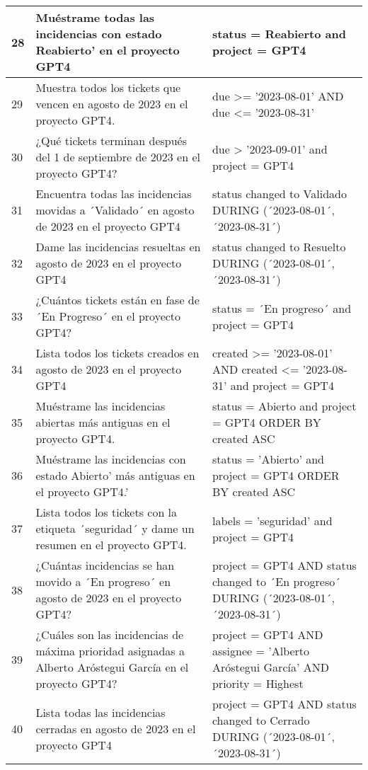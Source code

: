 \begin{center}
\begin{longtable}{ | p{1cm} | p{8cm} | p{6cm} | }
        \hline
        28 & Muéstrame todas las incidencias con estado Reabierto' en el proyecto GPT4 & status = Reabierto and project = GPT4 \\
        \hline
        29 & Muestra todos los tickets que vencen en agosto de 2023 en el proyecto GPT4. & due >= '2023-08-01' AND due <= '2023-08-31' \\
        \hline
        30 & ¿Qué tickets terminan después del 1 de septiembre de 2023 en el proyecto GPT4? & due > '2023-09-01' and project = GPT4 \\
        \hline
        31 & Encuentra todas las incidencias movidas a ´Validado´ en agosto de 2023 en el proyecto GPT4 & status changed to Validado DURING (´2023-08-01´, ´2023-08-31´) \\
        \hline
        32 & Dame las incidencias resueltas en agosto de 2023 en el proyecto GPT4 & status changed to Resuelto DURING (´2023-08-01´, ´2023-08-31´) \\
        \hline
        33 & ¿Cuántos tickets están en fase de ´En Progreso´ en el proyecto GPT4? & status = ´En progreso´ and project = GPT4 \\
        \hline
        34 & Lista todos los tickets creados en agosto de 2023 en el proyecto GPT4 & created >= '2023-08-01' AND created <= '2023-08-31' and project = GPT4 \\
        \hline
        35 & Muéstrame las incidencias abiertas más antiguas en el proyecto GPT4. & status = Abierto and project = GPT4 ORDER BY created ASC \\
        \hline
        36 & Muéstrame las incidencias con estado Abierto' más antiguas en el proyecto GPT4.' & status = 'Abierto' and project = GPT4 ORDER BY created ASC \\
        \hline
        37 & Lista todos los tickets con la etiqueta ´seguridad´ y dame un resumen en el proyecto GPT4. & labels = 'seguridad' and project = GPT4 \\
        \hline
        38 & ¿Cuántas incidencias se han movido a ´En progreso´ en agosto de 2023 en el proyecto GPT4? & project = GPT4 AND status changed to ´En progreso´ DURING (´2023-08-01´, ´2023-08-31´) \\
        \hline
        39 & ¿Cuáles son las incidencias de máxima prioridad asignadas a Alberto Aróstegui García en el proyecto GPT4? & project = GPT4 AND assignee = 'Alberto Aróstegui García' AND priority = Highest \\
        \hline
        40 & Lista todas las incidencias cerradas en agosto de 2023 en el proyecto GPT4 & project = GPT4 AND status changed to Cerrado DURING (´2023-08-01´, ´2023-08-31´) \\

\end{longtable}
\end{center}
